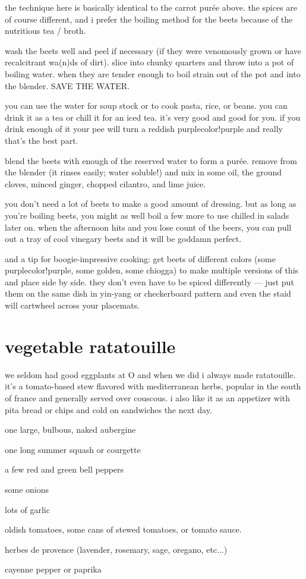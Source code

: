 the technique here is basically identical to the carrot pur\'{e}e above. the 
spices are of course different, and i prefer the boiling method for the beets 
because of the nutritious tea / broth.

wash the beets well and peel if necessary (if they were venomously grown or 
have recalcitrant wa(n)ds of dirt). slice into chunky quarters and throw into 
a pot of boiling water. when they are tender enough to boil strain out of the 
pot and into the blender. SAVE THE WATER.

you can use the water for soup stock or to cook pasta, rice, or beans. you can 
drink it as a tea or chill it for an iced tea. it's very good and good for 
you. if you drink enough of it your pee will turn a reddish purple{color!purple} and really 
that's the best part.

blend the beets with enough of the reserved water to form a pur\'{e}e. remove 
from the blender (it rinses easily; water soluble!) and mix in some oil, the 
ground cloves, minced ginger, chopped cilantro, and lime juice.

you don't need a lot of beets to make a good amount of dressing. but as long 
as you're boiling beets, you might as well boil a few more to use chilled in 
salads later on. when the afternoon hits and you lose count of the beers, you 
can pull out a tray of cool vinegary beets and it will be goddamn perfect.

and a tip for boogie-impressive cooking: get beets of different colors (some 
purple{color!purple}, some golden, some chiogga) to make multiple versions of this and place 
side by side. they don't even have to be spiced differently --- just put them 
on the same dish in yin-yang or checkerboard pattern and even the staid will 
cartwheel across your placemats.


\section{vegetable ratatouille}

we seldom had good eggplants at O  and when we did i always made 
ratatouille. it's a tomato-based stew flavored with mediterranean herbs, 
popular in the south of france and generally served over couscous. i also 
like it as an appetizer with pita bread or chips and cold on sandwiches the 
next day.

\begin{ingredients}
  \item one large, bulbous, naked aubergine
  \item one long summer squash or courgette
  \item a few red and green bell peppers
  \item some onions
  \item lots of garlic
  \item oldish tomatoes, some cans of stewed tomatoes, or tomato sauce.
  \item herbes de provence (lavender, rosemary, sage, oregano, etc...)
  \item cayenne pepper or paprika
\end{ingredients}

